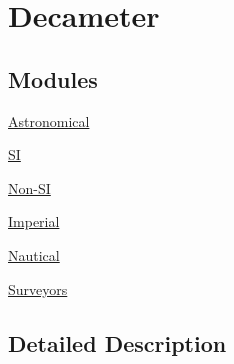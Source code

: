\hypertarget{group___e_g_x_math-_conversions-_length_conversions-_decameter}{}\section{Decameter}
\label{group___e_g_x_math-_conversions-_length_conversions-_decameter}
\subsection*{Modules}
\begin{DoxyCompactItemize}
\item 
\mbox{\hyperlink{group___e_g_x_math-_conversions-_length_conversions-_decameter-_astronomical}{Astronomical}}
\item 
\mbox{\hyperlink{group___e_g_x_math-_conversions-_length_conversions-_decameter-_s_i}{SI}}
\item 
\mbox{\hyperlink{group___e_g_x_math-_conversions-_length_conversions-_decameter-_non-_s_i}{Non-\/\+SI}}
\item 
\mbox{\hyperlink{group___e_g_x_math-_conversions-_length_conversions-_decameter-_imperial}{Imperial}}
\item 
\mbox{\hyperlink{group___e_g_x_math-_conversions-_length_conversions-_decameter-_nautical}{Nautical}}
\item 
\mbox{\hyperlink{group___e_g_x_math-_conversions-_length_conversions-_decameter-_surveyors}{Surveyors}}
\end{DoxyCompactItemize}


\subsection{Detailed Description}
